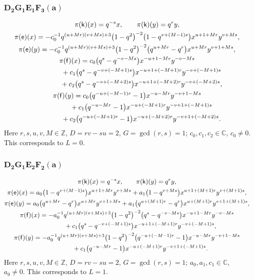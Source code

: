 \documentclass[10pt,a4paper]{amsart}
\numberwithin{equation}{section}
\begin{document}
\subsubsection*{$\boldsymbol{D_2G_1E_1F_3(a)}$}
\begin{gather*}
\pi(\mathsf{k})(x)= q^{-s}x ,\qquad\pi(\mathsf{k})(y)=q^ry ,\\
\pi(\mathsf{e})(x)= -c_0^{-1}q^{(u+Mr)(v+Ms)+3}\big(1-q^2\big)^{-2}\big(1-q^{v+(M-1)s}\big)x^{u+1+Mr}y^{v+Ms} ,\\
 \pi(\mathsf{e})(y)= -c_0^{-1}q^{(u+Mr)(v+Ms)+3}\big(1-q^2\big)^{-2}\big(q^{u+Mr}-q^r\big)x^{u+Mr}y^{v+1+Ms} ,\\
\pi(\mathsf{f})(x)=c_0\big(q^s-q^{-v-Ms}\big)x^{-u+1-Mr}y^{-v-Ms}\\
\hphantom{\pi(\mathsf{f})(x)=}{}+ c_1\big(q^s-q^{-v+(-M+1)s}\big)x^{-u+1+(-M+1)r}y^{-v+(-M+1)s}\\
\hphantom{\pi(\mathsf{f})(x)=}{}+ c_2\big(q^s-q^{-v+(-M+2)s}\big)x^{-u+1+(-M+2)r}y^{-v+(-M+2)s} ,\\
\pi(\mathsf{f})(y)= c_0\big(q^{-u+(-M-1)r}-1\big)x^{-u-Mr}y^{-v+1-Ms}\\
\hphantom{\pi(\mathsf{f})(y)=}{} + c_1\big(q^{-u-Mr}-1\big)x^{-u+(-M+1)r}y^{-v+1+(-M+1)s}\\
\hphantom{\pi(\mathsf{f})(y)=}{}+ c_2\big(q^{-u+(-M+1)r}-1\big)x^{-u+(-M+2)r}y^{-v+1+(-M+2)s} .
\end{gather*}
Here $r,s,u,v,M\in\mathbb{Z}$, $D=rv-su=2$, $G=\operatorname{gcd}(r,s)=1$; $c_0,c_1,c_2\in\mathbb{C}$, $c_0\ne 0$. This corresponds to $L=0$.

\subsubsection*{$\boldsymbol{D_2G_1E_2F_2(a)}$}
\begin{gather*}
\pi(\mathsf{k})(x)= q^{-s}x ,\qquad\pi(\mathsf{k})(y)=q^ry ,\\
\pi(\mathsf{e})(x)= a_0\big(1-q^{v+(M-1)s}\big)x^{u+1+Mr}y^{v+Ms}+ a_1\big(1-q^{v+Ms}\big)x^{u+1+(M+1)r}y^{v+(M+1)s} ,\\
\pi(\mathsf{e})(y)= a_0\big(q^{u+Mr}-q^r\big)x^{u+Mr}y^{v+1+Ms}+ a_1\big(q^{u+(M+1)r}-q^r\big)x^{u+(M+1)r}y^{v+1+(M+1)s} ,\\
\pi(\mathsf{f})(x)= -a_0^{-1}q^{(u+Mr)(v+Ms)+3}\big(1-q^2\big)^{-2}\big(q^s-q^{-v-Ms}\big)x^{-u+1-Mr}y^{-v-Ms}\\
\hphantom{\pi(\mathsf{f})(x)=}{}+ c_1\big(q^s-q^{-v+(-M+1)s}\big)x^{-u+1+(-M+1)r}y^{-v+(-M+1)s} ,\\
\pi(\mathsf{f})(y)= -a_0^{-1}q^{(u+Mr)(v+Ms)+3}\big(1-q^2\big)^{-2}\big(q^{-u+(-M-1)r}-1\big)x^{-u-Mr}y^{-v+1-Ms}\\
\hphantom{\pi(\mathsf{f})(y)=}{}+ c_1\big(q^{-u-Mr}-1\big)x^{-u+(-M+1)r}y^{-v+1+(-M+1)s} .
\end{gather*}
Here $r,s,u,v,M\in\mathbb{Z}$, $D=rv-su=2$, $G=\operatorname{gcd}(r,s)=1$; $a_0,a_1,c_1\in\mathbb{C}$, $a_0\ne 0$. This corresponds to $L=1$.
\end{document}
